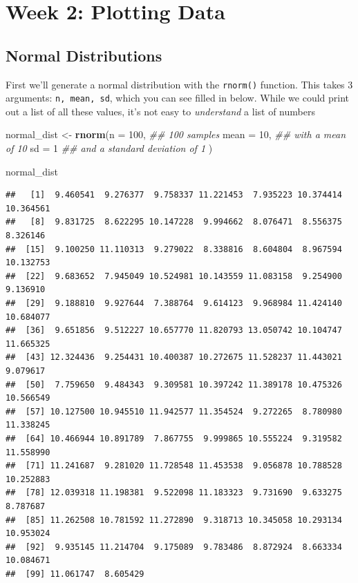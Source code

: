 \documentclass[
]{book}
\newenvironment{Shaded}{\begin{snugshade}}{\end{snugshade}}
\newcommand{\CommentTok}[1]{\textcolor[rgb]{0.56,0.35,0.01}{\textit{#1}}}
\newcommand{\DataTypeTok}[1]{\textcolor[rgb]{0.13,0.29,0.53}{#1}}
\newcommand{\DecValTok}[1]{\textcolor[rgb]{0.00,0.00,0.81}{#1}}
\newcommand{\KeywordTok}[1]{\textcolor[rgb]{0.13,0.29,0.53}{\textbf{#1}}}
\newcommand{\NormalTok}[1]{#1}
\newcommand{\StringTok}[1]{\textcolor[rgb]{0.31,0.60,0.02}{#1}}
\begin{document}
\hypertarget{week-2-plotting-data}{%
\section{Week 2: Plotting Data}\label{week-2-plotting-data}}

\hypertarget{normal-distributions}{%
\subsection{Normal Distributions}\label{normal-distributions}}

First we'll generate a normal distribution with the \texttt{rnorm()} function. This takes 3 arguments: \texttt{n,\ mean,\ sd}, which you can see filled in below. While we could print out a list of all these values, it's not easy to \emph{understand} a list of numbers

\begin{Shaded}
\begin{Highlighting}[]
\NormalTok{normal_dist <-}\StringTok{ }\KeywordTok{rnorm}\NormalTok{(}\DataTypeTok{n =} \DecValTok{100}\NormalTok{, }\CommentTok{## 100 samples}
                     \DataTypeTok{mean =} \DecValTok{10}\NormalTok{, }\CommentTok{## with a mean of 10}
                     \DataTypeTok{sd =} \DecValTok{1} \CommentTok{## and a standard deviation of 1}
\NormalTok{                     )}


\NormalTok{normal_dist}
\end{Highlighting}
\end{Shaded}

\begin{verbatim}
##   [1]  9.460541  9.276377  9.758337 11.221453  7.935223 10.374414 10.364561
##   [8]  9.831725  8.622295 10.147228  9.994662  8.076471  8.556375  8.326146
##  [15]  9.100250 11.110313  9.279022  8.338816  8.604804  8.967594 10.132753
##  [22]  9.683652  7.945049 10.524981 10.143559 11.083158  9.254900  9.136910
##  [29]  9.188810  9.927644  7.388764  9.614123  9.968984 11.424140 10.684077
##  [36]  9.651856  9.512227 10.657770 11.820793 13.050742 10.104747 11.665325
##  [43] 12.324436  9.254431 10.400387 10.272675 11.528237 11.443021  9.079617
##  [50]  7.759650  9.484343  9.309581 10.397242 11.389178 10.475326 10.566549
##  [57] 10.127500 10.945510 11.942577 11.354524  9.272265  8.780980 11.338245
##  [64] 10.466944 10.891789  7.867755  9.999865 10.555224  9.319582 11.558990
##  [71] 11.241687  9.281020 11.728548 11.453538  9.056878 10.788528 10.252883
##  [78] 12.039318 11.198381  9.522098 11.183323  9.731690  9.633275  8.787687
##  [85] 11.262508 10.781592 11.272890  9.318713 10.345058 10.293134 10.953024
##  [92]  9.935145 11.214704  9.175089  9.783486  8.872924  8.663334 10.084671
##  [99] 11.061747  8.605429
\end{verbatim}
\end{document}
